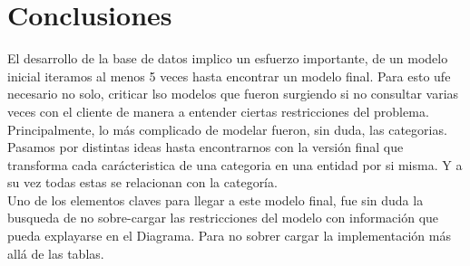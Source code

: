 \section{Conclusiones}

El desarrollo de la base de datos implico un esfuerzo importante, de un modelo inicial iteramos al menos 5 veces hasta encontrar un modelo final. Para esto ufe necesario no solo, criticar lso modelos que fueron surgiendo si no consultar varias veces con el cliente de manera a entender ciertas restricciones del problema.\\

Principalmente, lo más complicado de modelar fueron, sin duda, las categorias. Pasamos por distintas ideas hasta encontrarnos con la versión final que transforma cada carácteristica de una categoria en una entidad por si misma. Y a su vez todas estas se relacionan con la categoría. \\

Uno de los elementos claves para llegar a este modelo final, fue sin duda la busqueda de no sobre-cargar las restricciones del modelo con información que pueda explayarse en el Diagrama. Para no sobrer cargar la implementación más allá de las tablas. \\